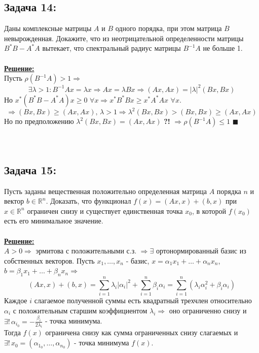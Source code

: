 \documentclass[a4paper,12pt,titlepage,final]{article}
\begin{document}
\subsection*{Задача 14:}
\noindent Даны комплексные матрицы $A$ и $B$ одного порядка, при этом матрица $B$ невырожденная. Докажите, что из неотрицательной определенности матрицы $B^*B - A^*A$ вытекает, что спектральный радиус матрицы $B^{-1}A$ не больше 1.\\ \\
\textbf{\underline{Решение:}} \\
Пусть $\rho(B^{-1}A) > 1 \Rightarrow$
$$ \exists \lambda > 1: B^{-1}Ax = \lambda x \Rightarrow Ax = \lambda Bx \Rightarrow (Ax, Ax) = |\lambda|^2 (Bx, Bx) $$
Но $x^*(B^*B - A^*A)x \geq 0$ $\forall x \Rightarrow x^*B^*Bx \geq x^*A^*Ax$ $\forall x$.
$$ \Rightarrow (Bx, Bx) \geq (Ax, Ax),\, \lambda > 1 \Rightarrow \lambda^2 (Bx, Bx) > (Bx, Bx) \geq (Ax, Ax)$$
Но по предположению $\lambda^2 (Bx, Bx) = (Ax, Ax)$ \textbf{?!} $\Rightarrow \rho(B^{-1}A) \leq 1$ $\blacksquare$ \\ \\ \\

\subsection*{Задача 15:}
\noindent Пусть заданы вещественная положительно определенная матрица $A$ порядка $n$ и вектор $b \in \mathbb{R}^n$. Доказать, что функционал $f(x) = (Ax, x) + (b, x)$ при $x \in \mathbb{R}^n$ ограничен снизу и существует единственная точка $x_0$, в которой
$f(x_0)$ есть его минимальное значение.\\ \\
\textbf{\underline{Решение:}} \\
$A > 0 \Rightarrow$ эрмитова с положительными с.з. $\Rightarrow \exists$ ортонормированный базис из собственных векторов. 
Пусть $x_1, \ldots, x_n$ - базис, $x = \alpha_1x_1 + \ldots + \alpha_nx_n$, $b = \beta_1x_1 + \ldots + \beta_nx_n \Rightarrow$
$$(Ax, x) + (b, x) = \sum_{i=1}^{n}\lambda_i|\alpha_i|^2 + \sum_{i=1}^{n}\beta_i\alpha_i = \sum_{i=1}^n(\lambda_i\alpha_i^2 + \beta_i\alpha_i)$$
Каждое $i$ слагаемое полученной суммы есть квадратный трехчлен относительно $\alpha_i$ с положительным старшим коэффициентом $\lambda_i \Rightarrow$ 
оно ограниченно снизу и $\exists!\,\alpha_{i_0} = -\frac{\beta_i}{2\lambda_i}$ - точка минимума. \\
Тогда $f(x)$ ограничена снизу как сумма ограниченных снизу слагаемых и $\exists!\,x_0 = (\alpha_{1_0}, \ldots, \alpha_{n_0})$ - точка минимума $f(x)$. \blacksquare \\ \\ \\
\end{document}
